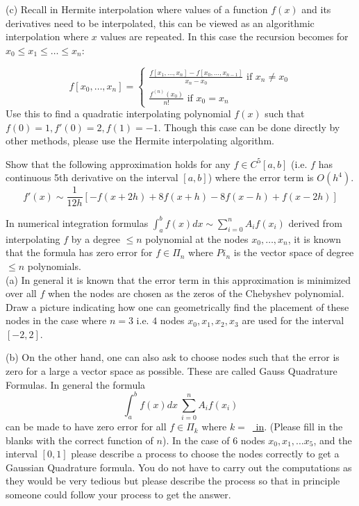 \documentclass[12pt]{article}
\begin{document}
\newpage

\noindent
(c) Recall in Hermite interpolation where values of a function $f(x)$ and its derivatives need to be interpolated, this can be viewed as an algorithmic interpolation  where $x$ values are repeated. In this case the recursion becomes
for $x_0 \leq x_1 \leq \dots \leq x_n$:

$$
f[x_0, \dots, x_n] = \begin{cases} \frac{f[x_1,\dots,x_n] - f[x_0, \dots, x_{n-1}]}{x_n-x_0} \text{ if } x_n \neq x_0 \\
\frac{f^{(n)}(x_0)}{n!} \text{ if } x_0=x_n
\end{cases}
$$
Use this to find a quadratic interpolating polynomial $f(x)$ such that \\
$f(0)=1, f'(0)=2, f(1)=-1$. Though this case can be done directly by other methods, please use the Hermite interpolating algorithm.

\vspace{3in}

Show that the following approximation holds for any $f \in C^5[a,b]$ (i.e. $f$ has continuous 5th derivative on the interval $[a,b]$) where the error term is $O(h^4)$.
$$
f'(x) \sim \frac{1}{12h}[-f(x+2h)+8f(x+h)-8f(x-h)+f(x-2h)] 
$$

\newpage

In numerical integration formulas $\int_a^b f(x) dx \sim \sum_{i=0}^n A_i f(x_i)$ derived from interpolating $f$ by a degree $\leq n$ polynomial at 
the nodes $x_0, \dots, x_n$, it is known that the formula has zero error for $f \in \Pi_n$ where $Pi_n$ is the vector space of degree $\leq n$ polynomials. \\
(a) In general it is known that the error term in this approximation is minimized over all $f$ when the nodes are chosen as the zeros of the Chebyshev polynomial.
Draw a picture indicating how one can geometrically find the placement of these nodes in the case where $n=3$ i.e. $4$ nodes $x_0, x_1, x_2, x_3$ are used 
for the interval $[-2,2]$.

\vspace{3 in}

\noindent
(b) On the other hand, one can also ask to choose nodes such that the error is zero for a large a vector space as possible. These are called 
Gauss Quadrature Formulas. In general the formula 
$$
\int_a^b f(x) dx ~ \sum_{i=0}^n A_i f(x_i)
$$
can be made to have zero error for all $f \in \Pi_k$ where $k=$~\underline{ in}. (Please fill in the blanks with the correct function of $n$).
In the case of $6$ nodes $x_0, x_1, \dots x_5$, and the interval $[0,1]$ please describe a process to choose the nodes correctly to get a 
Gaussian Quadrature formula. You do not have to carry out the computations as they would be very tedious but please describe the process so 
that in principle someone could follow your process to get the answer.
\end{document}
